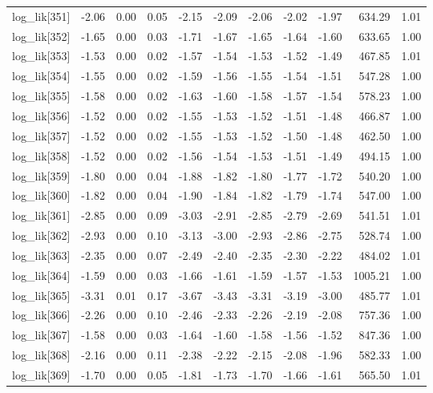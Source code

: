 \begin{table}[ht]
\begin{tabular}{rrrrrrrrrrr}
  log\_lik[351] & -2.06 & 0.00 & 0.05 & -2.15 & -2.09 & -2.06 & -2.02 & -1.97 & 634.29 & 1.01 \\ 
  log\_lik[352] & -1.65 & 0.00 & 0.03 & -1.71 & -1.67 & -1.65 & -1.64 & -1.60 & 633.65 & 1.00 \\ 
  log\_lik[353] & -1.53 & 0.00 & 0.02 & -1.57 & -1.54 & -1.53 & -1.52 & -1.49 & 467.85 & 1.01 \\ 
  log\_lik[354] & -1.55 & 0.00 & 0.02 & -1.59 & -1.56 & -1.55 & -1.54 & -1.51 & 547.28 & 1.00 \\ 
  log\_lik[355] & -1.58 & 0.00 & 0.02 & -1.63 & -1.60 & -1.58 & -1.57 & -1.54 & 578.23 & 1.00 \\ 
  log\_lik[356] & -1.52 & 0.00 & 0.02 & -1.55 & -1.53 & -1.52 & -1.51 & -1.48 & 466.87 & 1.00 \\ 
  log\_lik[357] & -1.52 & 0.00 & 0.02 & -1.55 & -1.53 & -1.52 & -1.50 & -1.48 & 462.50 & 1.00 \\ 
  log\_lik[358] & -1.52 & 0.00 & 0.02 & -1.56 & -1.54 & -1.53 & -1.51 & -1.49 & 494.15 & 1.00 \\ 
  log\_lik[359] & -1.80 & 0.00 & 0.04 & -1.88 & -1.82 & -1.80 & -1.77 & -1.72 & 540.20 & 1.00 \\ 
  log\_lik[360] & -1.82 & 0.00 & 0.04 & -1.90 & -1.84 & -1.82 & -1.79 & -1.74 & 547.00 & 1.00 \\ 
  log\_lik[361] & -2.85 & 0.00 & 0.09 & -3.03 & -2.91 & -2.85 & -2.79 & -2.69 & 541.51 & 1.01 \\ 
  log\_lik[362] & -2.93 & 0.00 & 0.10 & -3.13 & -3.00 & -2.93 & -2.86 & -2.75 & 528.74 & 1.00 \\ 
  log\_lik[363] & -2.35 & 0.00 & 0.07 & -2.49 & -2.40 & -2.35 & -2.30 & -2.22 & 484.02 & 1.01 \\ 
  log\_lik[364] & -1.59 & 0.00 & 0.03 & -1.66 & -1.61 & -1.59 & -1.57 & -1.53 & 1005.21 & 1.00 \\ 
  log\_lik[365] & -3.31 & 0.01 & 0.17 & -3.67 & -3.43 & -3.31 & -3.19 & -3.00 & 485.77 & 1.01 \\ 
  log\_lik[366] & -2.26 & 0.00 & 0.10 & -2.46 & -2.33 & -2.26 & -2.19 & -2.08 & 757.36 & 1.00 \\ 
  log\_lik[367] & -1.58 & 0.00 & 0.03 & -1.64 & -1.60 & -1.58 & -1.56 & -1.52 & 847.36 & 1.00 \\ 
  log\_lik[368] & -2.16 & 0.00 & 0.11 & -2.38 & -2.22 & -2.15 & -2.08 & -1.96 & 582.33 & 1.00 \\ 
  log\_lik[369] & -1.70 & 0.00 & 0.05 & -1.81 & -1.73 & -1.70 & -1.66 & -1.61 & 565.50 & 1.01 \\ 

\end{tabular}
\end{table}
